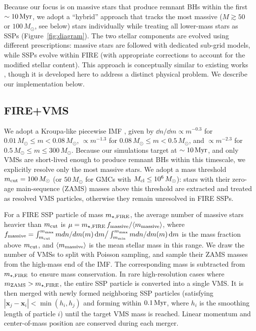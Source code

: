 \documentclass[twocolumn]{aastex631}
\begin{document}
Because our focus is on massive stars that produce remnant BHs within the first $\sim 10\,\rm Myr$, we adopt a ``hybrid'' approach that tracks the most massive ($M\gtrsim50$ or $100\,M_\odot$, see below) stars individually while treating all lower-mass stars as SSPs (Figure~\ref{fig:diagram}). The two stellar components are evolved using different prescriptions: massive stars are followed with dedicated sub-grid models, while SSPs evolve within FIRE (with appropriate corrections to account for the modified stellar content). This approach is conceptually similar to existing works \citep{LahenNaabJohansson_2020ApJ...891....2L,AnderssonAgertzRenaud_2023MNRAS.521.2196A,PartmannNaabLahen_2025MNRAS.537..956P,AnderssonReyPontzen_2025ApJ...978..129A}, though it is developed here to address a distinct physical problem. We describe our implementation below.


\subsection{FIRE+VMS}

We adopt a Kroupa-like piecewise IMF \citep{Kroupa_2002Sci...295...82K}, given by $\dd n/\dd m \propto m^{-0.3}$ for $0.01\,M_\odot \le m < 0.08\,M_\odot$, $\propto m^{-1.3}$ for $0.08\,M_\odot \le m < 0.5\,M_\odot$, and $\propto m^{-2.3}$ for $ 0.5\,M_\odot \le m \le 300\,M_\odot$. Because our simulations target at $\sim 10\,\rm Myr$, and only VMSs are short-lived enough \citep[$\gtrsim 3\,\rm Myr$; e.g.,][]{PortinariChiosiBressan_1998A&A...334..505P} to produce remnant BHs within this timescale, we explicitly resolve only the most massive stars. We adopt a mass threshold $m_{\rm cut}=100\,M_\odot$ (or $50\,M_\odot$ for GMCs with $M_{\rm cl}\le 10^6\,M_\odot$): stars with their zero-age main-sequence (ZAMS) masses above this threshold are extracted and treated as resolved VMS particles, otherwise they remain unresolved in FIRE SSPs.

For a FIRE SSP particle of mass $m_{\star,\rm FIRE}$, the average number of massive stars heavier than $m_{\rm cut}$ is $\mu = m_{\star,\rm FIRE}\, f_{\rm massive}/\langle m_{\rm massive} \rangle$, where $f_{\rm massive} = \int_{m_{\rm cut}}^{m_{\rm max}} m {dn/dm}(m)\,\dd m \big/ \int_{m_{\rm min}}^{m_{\rm max}} m {dn/dm}(m)\,\dd m$ is the mass fraction above $m_{\rm cut}$, and $\langle m_{\rm massive} \rangle$ is the mean stellar mass in this range. We draw the number of VMSs to split with Poisson sampling, and sample their ZAMS masses from the high-mass end of the IMF. The corresponding mass is subtracted from $m_{\star,\rm FIRE}$ to ensure mass conservation. In rare high-resolution cases where $m_{\rm ZAMS} > m_{\star,\rm FIRE}$, the entire SSP particle is converted into a single VMS. It is then merged with newly formed neighboring SSP particles (satisfying $|\mathbf x_j - \mathbf x_i| < \min(h_i, h_j)$ and forming within $0.1\,\rm Myr$, where $h_i$ is the smoothing length of particle $i$) until the target VMS mass is reached. Linear momentum and center-of-mass position are conserved during each merger.
\end{document}
